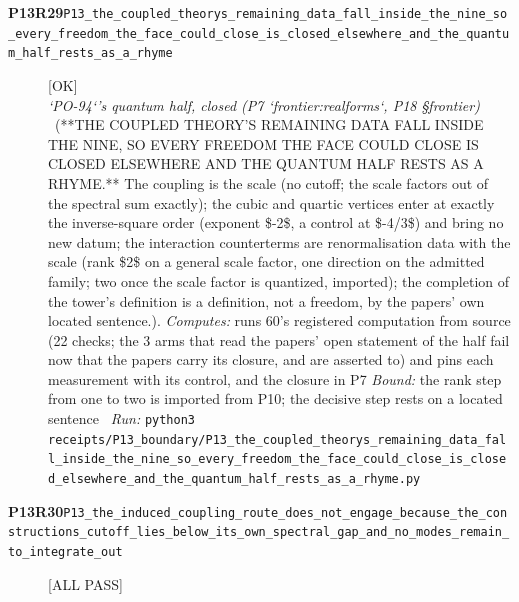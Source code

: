 \begin{description}
\item[\textbf{P13R29}\quad\texttt{P13\_the\_coupled\_theorys\_remaining\_data\_fall\_inside\_the\_nine\_so\_every\_freedom\_the\_face\_could\_close\_is\_closed\_elsewhere\_and\_the\_quantum\_half\_rests\_as\_a\_rhyme}]\hfill\textsf{[OK]}\\
\textit{`PO-94`'s quantum half, closed (P7 `frontier:realforms`, P18 \S{}frontier)} \ (**THE COUPLED THEORY'S REMAINING DATA FALL INSIDE THE NINE, SO EVERY FREEDOM THE FACE COULD CLOSE IS CLOSED ELSEWHERE AND THE QUANTUM HALF RESTS AS A RHYME.** The coupling is the scale (no cutoff; the scale factors out of the spectral sum exactly); the cubic and quartic vertices enter at exactly the inverse-square order (exponent \$-2\$, a control at \$-4/3\$) and bring no new datum; the interaction counterterms are renormalisation data with the scale (rank \$2\$ on a general scale factor, one direction on the admitted family; two once the scale factor is quantized, imported); the completion of the tower's definition is a definition, not a freedom, by the papers' own located sentence.). 
\emph{Computes:} runs 60's registered computation from source (22 checks; the 3 arms that read the papers' open statement of the half fail now that the papers carry its closure, and are asserted to) and pins each measurement with its control, and the closure in P7
 \emph{Bound:} the rank step from one to two is imported from P10; the decisive step rests on a located sentence
\ \emph{Run:} \texttt{python3 receipts/P13\_boundary/P13\_the\_coupled\_theorys\_remaining\_data\_fall\_inside\_the\_nine\_so\_every\_freedom\_the\_face\_could\_close\_is\_closed\_elsewhere\_and\_the\_quantum\_half\_rests\_as\_a\_rhyme.py}
\item[\textbf{P13R30}\quad\texttt{P13\_the\_induced\_coupling\_route\_does\_not\_engage\_because\_the\_constructions\_cutoff\_lies\_below\_its\_own\_spectral\_gap\_and\_no\_modes\_remain\_to\_integrate\_out}]\hfill\textsf{[ALL PASS]}\\

\end{description}
